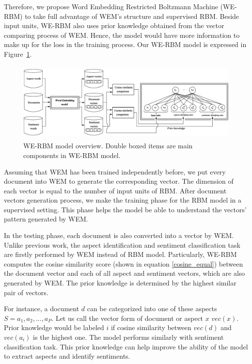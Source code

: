 Therefore, we propose Word Embedding Restricted Boltzmann Machine (WE-RBM) to take full advantage of WEM's structure and supervised RBM.
Beside input units, WE-RBM also uses prior knowledge obtained from the vector comparing process of WEM.
Hence, the model would have more information to make up for the loss in the training process.
Our WE-RBM model is expressed in Figure~\ref{fig:vs-rbm}.

\begin{figure}
	\centering
	\includegraphics[height=4.0cm]{WE-RBM}
	\caption{WE-RBM model overview. Double boxed items are main components in WE-RBM model.}
	\label{fig:vs-rbm}
\end{figure}

Assuming that WEM has been trained independently before, we put every document into WEM to generate the corresponding vector.
The dimension of each vector is equal to the number of input units of RBM.
After document vectors generation process, we make the training phase for the RBM model in a supervised setting.
This phase helps the model be able to understand the vectors' pattern generated by WEM.

In the testing phase, each document is also converted into a vector by WEM.
Unlike previous work, the aspect identification and sentiment classification task are firstly performed by WEM instead of RBM model.
Particularly, WE-RBM computes the cosine similarity score (shown in equation \ref{cosine_equal}) between the document vector and each of all aspect and sentiment vectors, which are also generated by WEM.
The prior knowledge is determined by the highest similar pair of vectors.

For instance, a document $d$ can be categorized into one of these aspects $S = {a_1, a_2,..., a_P}$.
Let us call the vector form of document or aspect $x$ $vec(x)$.
Prior knowledge would be labeled $i$ if cosine similarity between $vec(d)$ and $vec(a_i)$ is the highest one.
The model performs similarly with sentiment classification task.
This prior knowledge can help improve the ability of the model to extract aspects and identify sentiments.
 
